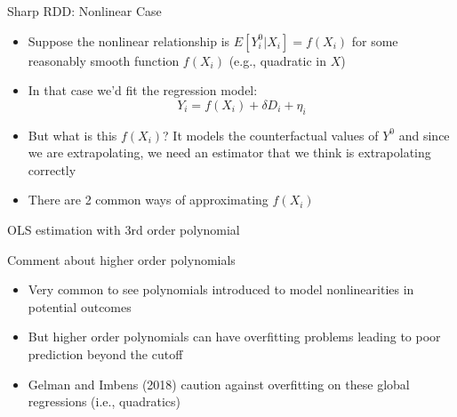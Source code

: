 \documentclass{beamer}
\begin{document}
\begin{frame}{Sharp RDD: Nonlinear Case}
	
	\begin{itemize}
	\item Suppose the nonlinear relationship is $E[Y_i^0 | X_i]=f(X_i)$ for some reasonably smooth function $f(X_i)$ (e.g., quadratic in $X$) 
	\item In that case we'd fit the regression model:$$Y_i=f(X_i) + \delta{D_i} + \eta_i$$
	\item But what is this $f(X_i)$? It models the counterfactual values of $Y^0$ and since we are extrapolating, we need an estimator that we think is extrapolating correctly
	\item There are 2 common ways of approximating $f(X_i)$	
	\end{itemize}
\end{frame}

\begin{frame}{OLS estimation with 3rd order polynomial}
	
	\begin{figure}
	\end{figure}

	
\end{frame}

\begin{frame}{Comment about higher order polynomials}

\begin{itemize}
\item Very common to see polynomials introduced to model nonlinearities in potential outcomes
\item But higher order polynomials can have overfitting problems leading to poor prediction beyond the cutoff 
\item Gelman and Imbens (2018) caution against overfitting on these global regressions (i.e., quadratics) 
\end{itemize}

\end{frame}
\end{document}
